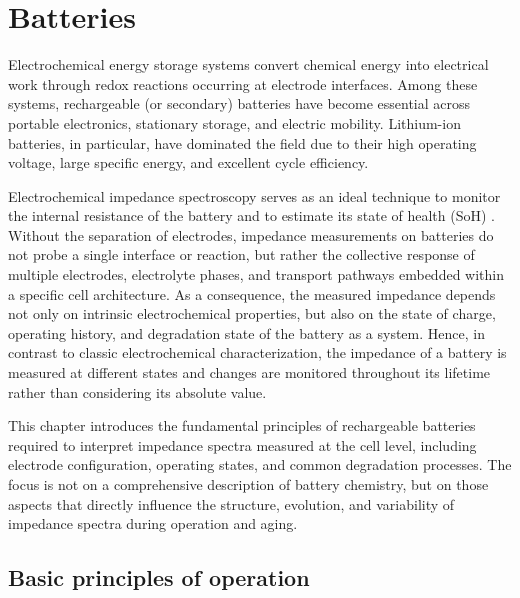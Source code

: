 \chapter{Batteries}
\label{ch:batteries}

Electrochemical energy storage systems convert chemical energy into electrical work through redox reactions occurring at electrode interfaces.
Among these systems, rechargeable (or secondary) batteries have become essential across portable electronics, stationary storage, and electric mobility. 
Lithium-ion batteries, in particular, have dominated the field due to their high operating voltage, large specific energy, and excellent cycle efficiency. 

Electrochemical impedance spectroscopy serves as an ideal technique to monitor the internal resistance of the battery and to estimate its state of health (SoH) \cite{liuStateHealthEst,Hofmann_2023, QIAN2025125272}.
Without the separation of electrodes, impedance measurements on batteries do not probe a single interface or reaction, but rather the collective response of multiple electrodes, electrolyte phases, and transport pathways embedded within a specific cell architecture.
As a consequence, the measured impedance depends not only on intrinsic electrochemical properties, but also on the state of charge, operating history, and degradation state of the battery as a system.
Hence, in contrast to classic electrochemical characterization, the impedance of a battery is measured at different states and changes are monitored throughout its lifetime rather than considering its absolute value.

This chapter introduces the fundamental principles of rechargeable batteries required to interpret impedance spectra measured at the cell level, including electrode configuration, operating states, and common degradation processes.
The focus is not on a comprehensive description of battery chemistry, but on those aspects that directly influence the structure, evolution, and variability of impedance spectra during operation and aging.

\section{Basic principles of operation}

